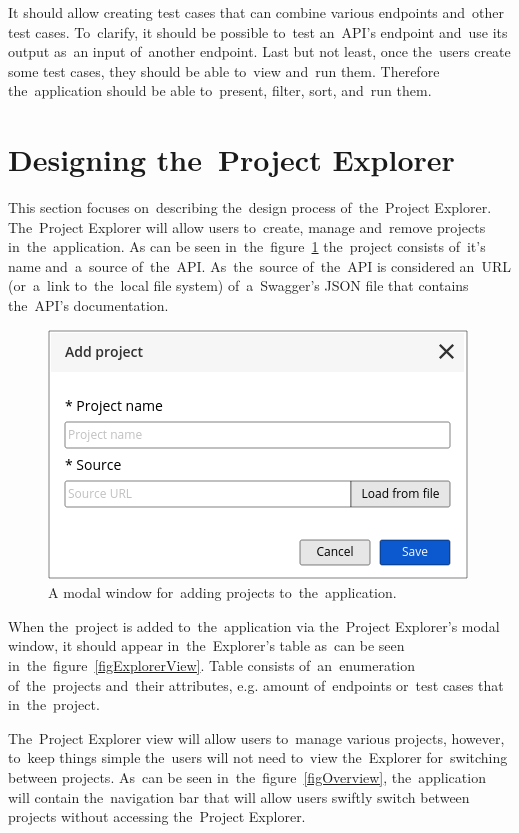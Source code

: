 It should allow creating test cases that can combine various endpoints and~other
test cases. To~clarify, it should be possible to~test an~API's endpoint and~use
its output as~an input of~another endpoint. Last but not least, once the~users
create some test cases, they should be able to~view and~run them. Therefore
the~application should be able to~present, filter, sort, and~run them.

\section{Designing the~Project Explorer}
This section focuses on~describing the~design process of~the~Project Explorer.
The~Project Explorer will allow users to~create, manage and~remove projects
in~the~application.
As can be seen in~the~figure~\ref{figExplorer} the~project consists of~it's name
and~a~source of~the~API. As~the~source of~the~API is considered an~URL
(or~a~link to~the~local file system) of~a~Swagger's JSON file that contains
the~API's documentation.

\begin{figure}[!hbt]
	\centering
	\includegraphics[scale=0.7]{./designs/addProject.png}
	\caption{A modal window for~adding projects to~the~application.}
	\label{figExplorer}
\end{figure}

When the~project is added to~the~application via the~Project Explorer's modal
window, it should appear in~the~Explorer's table as~can be seen
in~the~figure~\ref{figExplorerView}. Table consists of~an~enumeration
of~the~projects and~their attributes, e.g. amount of~endpoints or~test cases
that in~the~project.

The~Project Explorer view will allow users to~manage various projects, however,
to~keep things simple the~users will not need to~view the~Explorer for~switching
between projects. As~can be seen in~the~figure~\ref{figOverview},
the~application will contain the~navigation bar that will allow users swiftly
switch between projects without accessing the~Project Explorer.

